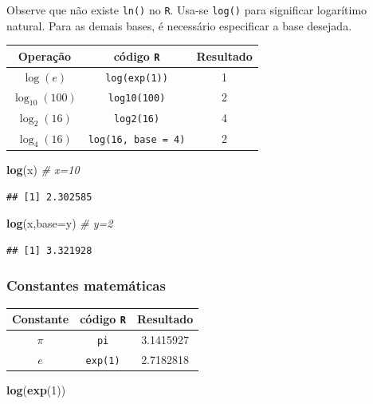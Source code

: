 \documentclass[
]{book}
\newenvironment{Shaded}{\begin{snugshade}}{\end{snugshade}}
\newcommand{\CommentTok}[1]{\textcolor[rgb]{0.56,0.35,0.01}{\textit{#1}}}
\newcommand{\DataTypeTok}[1]{\textcolor[rgb]{0.13,0.29,0.53}{#1}}
\newcommand{\DecValTok}[1]{\textcolor[rgb]{0.00,0.00,0.81}{#1}}
\newcommand{\KeywordTok}[1]{\textcolor[rgb]{0.13,0.29,0.53}{\textbf{#1}}}
\newcommand{\NormalTok}[1]{#1}
\theoremstyle{definition}
\theoremstyle{definition}
\theoremstyle{definition}
\theoremstyle{remark}
\begin{document}
Observe que não existe \texttt{ln()} no \texttt{R}. Usa-se \texttt{log()} para significar logarítimo natural. Para as demais bases, é necessário especificar a base desejada.

\begin{longtable}[]{@{}ccc@{}}
\toprule
Operação & código \texttt{R} & Resultado\tabularnewline
\midrule
\endhead
\(\log(e)\) & \texttt{log(exp(1))} & 1\tabularnewline
\(\log_{10}(100)\) & \texttt{log10(100)} & 2\tabularnewline
\(\log_{2}(16)\) & \texttt{log2(16)} & 4\tabularnewline
\(\log_{4}(16)\) & \texttt{log(16,\ base\ =\ 4)} & 2\tabularnewline
\bottomrule
\end{longtable}

\begin{Shaded}
\begin{Highlighting}[]
\KeywordTok{log}\NormalTok{(x)        }\CommentTok{# x=10}
\end{Highlighting}
\end{Shaded}

\begin{verbatim}
## [1] 2.302585
\end{verbatim}

\begin{Shaded}
\begin{Highlighting}[]
\KeywordTok{log}\NormalTok{(x,}\DataTypeTok{base=}\NormalTok{y) }\CommentTok{# y=2}
\end{Highlighting}
\end{Shaded}

\begin{verbatim}
## [1] 3.321928
\end{verbatim}

\hypertarget{constantes-matemuxe1ticas}{%
\subsubsection{Constantes matemáticas}\label{constantes-matemuxe1ticas}}

\begin{longtable}[]{@{}ccc@{}}
\toprule
Constante & código \texttt{R} & Resultado\tabularnewline
\midrule
\endhead
\(\pi\) & \texttt{pi} & 3.1415927\tabularnewline
\(e\) & \texttt{exp(1)} & 2.7182818\tabularnewline
\bottomrule
\end{longtable}

\begin{Shaded}
\begin{Highlighting}[]
\KeywordTok{log}\NormalTok{(}\KeywordTok{exp}\NormalTok{(}\DecValTok{1}\NormalTok{)) }
\end{Highlighting}
\end{Shaded}
\end{document}
